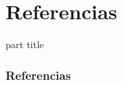 \documentclass{beamer}
\begin{document}
\section{Referencias}
\begin{frame}
\begin{center}
	\begin{beamercolorbox}[
		sep=8pt,center,rounded=true,shadow=true,shadow=true]{part title}
		\secname
	\end{beamercolorbox}
\end{center}
\end{frame}

\begin{frame}[shrink=30]
\frametitle{Referencias}
	

\end{frame}
\end{document}
